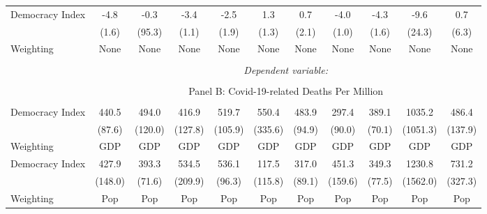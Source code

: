 \begin{landscape}
\begin{table}[!htbp]
\begin{threeparttable}
\begin{tabular}{@{\extracolsep{0pt}}lcccccccccc}
Democracy Index     &        -4.8\sym{**} &        -0.3         &        -3.4\sym{**} &        -2.5         &         1.3         &         0.7         &        -4.0\sym{***}&        -4.3\sym{**} &        -9.6         &         0.7         \\
                    &       (1.6)         &      (95.3)         &       (1.1)         &       (1.9)         &       (1.3)         &       (2.1)         &       (1.0)         &       (1.6)         &      (24.3)         &       (6.3)         \\


 Weighting & None & None & None & None & None & None & None & None & None & None \\ 
 \hline \\[-1.8ex] 

  & \multicolumn{10}{c}{\textit{Dependent variable:} } \\ 
\cline{2-11} 
\\[-1.8ex] & \multicolumn{10}{c}{Panel B: Covid-19-related Deaths Per Million} \\  \\
Democracy Index     &       440.5\sym{***}&       494.0\sym{***}&       416.9\sym{**} &       519.7\sym{***}&       550.4         &       483.9\sym{***}&       297.4\sym{***}&       389.1\sym{***}&      1035.2         &       486.4\sym{***}\\
                    &      (87.6)         &     (120.0)         &     (127.8)         &     (105.9)         &     (335.6)         &      (94.9)         &      (90.0)         &      (70.1)         &    (1051.3)         &     (137.9)         \\

 Weighting & GDP & GDP & GDP & GDP & GDP & GDP & GDP & GDP & GDP & GDP   \\

Democracy Index     &       427.9\sym{**} &       393.3\sym{***}&       534.5\sym{*}  &       536.1\sym{***}&       117.5         &       317.0\sym{***}&       451.3\sym{**} &       349.3\sym{***}&      1230.8         &       731.2\sym{*}  \\
                    &     (148.0)         &      (71.6)         &     (209.9)         &      (96.3)         &     (115.8)         &      (89.1)         &     (159.6)         &      (77.5)         &    (1562.0)         &     (327.3)         \\


 Weighting & Pop & Pop & Pop & Pop & Pop & Pop & Pop & Pop & Pop & Pop  \\ %


\end{tabular}
\end{threeparttable}
\end{table}
\end{landscape}

